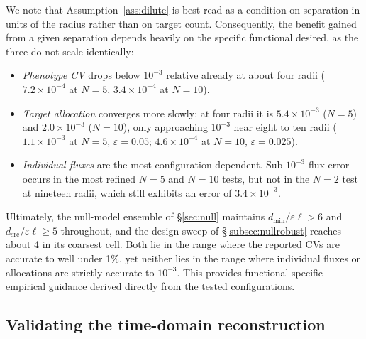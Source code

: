 \documentclass[pdflatex,sn-mathphys-num]{sn-jnl}
\numberwithin{equation}{section}
\theoremstyle{thmstyleone}%
\theoremstyle{definition}
\theoremstyle{remark}
\begin{document}
We note that Assumption~\ref{ass:dilute} is best read as a condition on separation
in units of the radius rather than on target count. Consequently, the benefit gained from a given separation depends heavily on the specific functional desired, as the three do not scale identically:

\begin{itemize}[itemsep=2pt,topsep=3pt]
\item \emph{Phenotype CV} drops below $10^{-3}$ relative already at about four radii ($7.2\times10^{-4}$ at $N=5$, $3.4\times10^{-4}$ at $N=10$).
\item \emph{Target allocation} converges more slowly: at four radii it is $5.4\times10^{-3}$ ($N=5$) and $2.0\times10^{-3}$ ($N=10$), only approaching $10^{-3}$ near eight to ten radii ($1.1\times10^{-3}$ at $N=5$, $\varepsilon=0.05$; $4.6\times10^{-4}$ at $N=10$, $\varepsilon=0.025$).
\item \emph{Individual fluxes} are the most configuration-dependent. Sub-$10^{-3}$ flux error occurs in the most refined $N=5$ and $N=10$ tests, but not in the $N=2$ test at nineteen radii, which still exhibits an error of $3.4\times10^{-3}$.
\end{itemize}

Ultimately, the null-model ensemble of \S\ref{sec:null} maintains $d_{\min}/\varepsilon\ell>6$ and $d_{\mathrm{src}}/\varepsilon\ell\ge5$ throughout, and the design sweep of \S\ref{subsec:nullrobust} reaches about 4 in its coarsest cell. Both lie in the range where the reported CVs are accurate to well under 1\%, yet neither lies in the range where individual fluxes or allocations are strictly accurate to $10^{-3}$. This provides functional-specific empirical guidance derived directly from the tested configurations.

\subsection{Validating the time-domain reconstruction}
\label{subsec:gammaverify}
\end{document}
